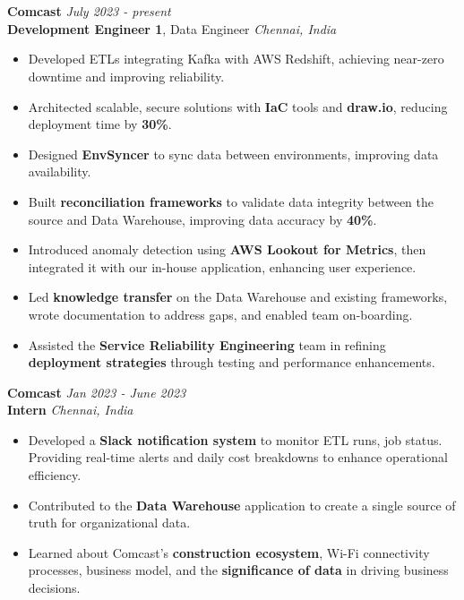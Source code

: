 \documentclass[a4paper,10pt]{article}
\begin{document}
\section{\scshape\color{Fuchsia}{\faUserTie\ \textbf EXPERIENCE}}
\textbf{Comcast} \href{https://corporate.comcast.com/}{} \hfill
\textit{July 2023 - present} \\
\textbf{Development Engineer 1}, Data Engineer \hfill \textit{Chennai, India}
\vspace{-2mm}
\begin{itemize}
    \item Developed ETLs integrating Kafka with AWS Redshift, achieving near-zero downtime and improving reliability.
    \vspace{-2mm}
    \item Architected scalable, secure solutions with \textbf{IaC} tools and \textbf{draw.io}, reducing deployment time by \textbf{30\%}.
    \vspace{-2mm}
    \item Designed \textbf{EnvSyncer} to sync data between environments, improving data availability.
    \vspace{-2mm}
    \item Built \textbf{reconciliation frameworks} to validate data integrity between the source and Data Warehouse, improving data accuracy by \textbf{40\%}.
    \vspace{-2mm}
    \item Introduced anomaly detection using \textbf{AWS Lookout for Metrics}, then integrated it with our in-house application, enhancing user experience.
    \vspace{-2mm}
    \item Led \textbf{knowledge transfer} on the Data Warehouse and existing frameworks, wrote documentation to address gaps, and enabled team on-boarding.
    \vspace{-2mm}
    \item Assisted the \textbf{Service Reliability Engineering} team in refining \textbf{deployment strategies} through testing and performance enhancements.
\end{itemize}
\textbf{Comcast} \href{https://drive.google.com/file/d/1pad_OUtVNHKm3s1Kb-_xwyZAXJBjz7gX/view?usp=sharing}{} \hfill \textit{Jan 2023 - June 2023} \\
\textbf{Intern} \hfill \textit{Chennai, India}
\vspace{-2mm}
\begin{itemize}
    \item Developed a \textbf{Slack notification system} to monitor ETL runs, job status. Providing real-time alerts and daily cost breakdowns to enhance operational efficiency.
    \vspace{-2mm}
    \item Contributed to the \textbf{Data Warehouse} application to create a single source of truth for organizational data.
    \vspace{-2mm}
    \item Learned about Comcast's \textbf{construction ecosystem}, Wi-Fi connectivity processes, business model, and the \textbf{significance of data} in driving business decisions.
\end{itemize}
\end{document}
